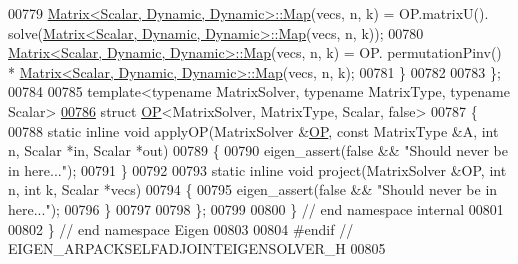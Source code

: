 \begin{DoxyCode}
00779     \hyperlink{group___core___module_class_eigen_1_1_matrix}{Matrix<Scalar, Dynamic, Dynamic>::Map}(vecs, n, k) = OP.matrixU().
      solve(\hyperlink{group___core___module_class_eigen_1_1_matrix}{Matrix<Scalar, Dynamic, Dynamic>::Map}(vecs, n, k));
00780     \hyperlink{group___core___module_class_eigen_1_1_matrix}{Matrix<Scalar, Dynamic, Dynamic>::Map}(vecs, n, k) = OP.
      permutationPinv() * \hyperlink{group___core___module_class_eigen_1_1_matrix}{Matrix<Scalar, Dynamic, Dynamic>::Map}(vecs, n, k);
00781 \}
00782 
00783 \};
00784 
00785 \textcolor{keyword}{template}<\textcolor{keyword}{typename} MatrixSolver, \textcolor{keyword}{typename} MatrixType, \textcolor{keyword}{typename} Scalar>
\hyperlink{struct_eigen_1_1internal_1_1_o_p_3_01_matrix_solver_00_01_matrix_type_00_01_scalar_00_01false_01_4}{00786} \textcolor{keyword}{struct }\hyperlink{struct_eigen_1_1internal_1_1_o_p}{OP}<MatrixSolver, MatrixType, Scalar, false>
00787 \{
00788   \textcolor{keyword}{static} \textcolor{keyword}{inline} \textcolor{keywordtype}{void} applyOP(MatrixSolver &\hyperlink{struct_eigen_1_1internal_1_1_o_p}{OP}, \textcolor{keyword}{const} MatrixType &A, \textcolor{keywordtype}{int} n, Scalar *in, Scalar *out)
00789 \{
00790     eigen\_assert(\textcolor{keyword}{false} && \textcolor{stringliteral}{"Should never be in here..."});
00791 \}
00792 
00793   \textcolor{keyword}{static} \textcolor{keyword}{inline} \textcolor{keywordtype}{void} project(MatrixSolver &OP, \textcolor{keywordtype}{int} n, \textcolor{keywordtype}{int} k, Scalar *vecs)
00794 \{
00795     eigen\_assert(\textcolor{keyword}{false} && \textcolor{stringliteral}{"Should never be in here..."});
00796 \}
00797 
00798 \};
00799 
00800 \} \textcolor{comment}{// end namespace internal}
00801 
00802 \} \textcolor{comment}{// end namespace Eigen}
00803 
00804 \textcolor{preprocessor}{#endif // EIGEN\_ARPACKSELFADJOINTEIGENSOLVER\_H}
00805 
\end{DoxyCode}
